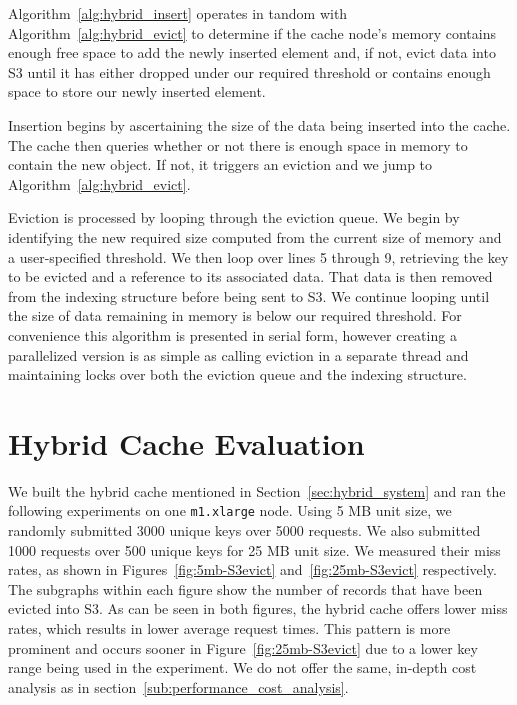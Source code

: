 Algorithm~\ref{alg:hybrid_insert} operates in tandom with
Algorithm~\ref{alg:hybrid_evict} to determine if the cache node's memory
contains enough free space to add the newly inserted element and, if not, evict
data into S3 until it has either dropped under our required threshold or
contains enough space to store our newly inserted element.

Insertion begins by ascertaining the size of the data being inserted into the
cache. The cache then queries whether or not there is enough space in memory to
contain the new object. If not, it triggers an eviction and we jump to
Algorithm~\ref{alg:hybrid_evict}.

Eviction is processed by looping through the eviction queue. We begin by
identifying the new required size computed from the current size of memory and
a user-specified threshold. We then loop over lines 5 through 9, retrieving the
key to be evicted and a reference to its associated data. That data is then
removed from the indexing structure before being sent to S3. We continue
looping until the size of data remaining in memory is below our required
threshold. For convenience this algorithm is presented in serial form, however
creating a parallelized version is as simple as calling eviction in a separate
thread and maintaining locks over both the eviction queue and the indexing
structure.




\section{Hybrid Cache Evaluation} %
\label{sub:hybrid_system_evaluation}
We built the hybrid cache mentioned in Section~\ref{sec:hybrid_system} and ran
the following experiments on one {\tt m1.xlarge} node. Using 5 MB unit size, we
randomly submitted 3000 unique keys over 5000 requests. We also submitted 1000
requests over 500 unique keys for 25 MB unit size. We measured their miss
rates, as shown in Figures~\ref{fig:5mb-S3evict} and~\ref{fig:25mb-S3evict}
respectively. The subgraphs within each figure show the number of records that
have been evicted into S3. As can be seen in both figures, the hybrid cache
offers lower miss rates, which results in lower average request times. This
pattern is more prominent and occurs sooner in Figure~\ref{fig:25mb-S3evict}
due to a lower key range being used in the experiment. We do not offer the
same, in-depth cost analysis as in section~\ref{sub:performance_cost_analysis}.

